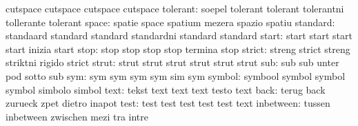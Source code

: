                            cutspace                  cutspace
                           cutspace                  cutspace %
                 tolerant: soepel                    tolerant
                           tolerant                  tolerantni
                           tollerante                tolerant
                    space: spatie                    space
                           spatium                   mezera
                           spazio                    spatiu %
                 standard: standaard                 standard
                           standard                  standardni
                           standard                  standard
                    start: start                     start
                           start                     start
                           inizia                    start
                     stop: stop                      stop
                           stop                      stop
                           termina                   stop
                   strict: streng                    strict
                           streng                    striktni
                           rigido                    strict
                    strut: strut                     strut
                           strut                     strut
                           strut                     strut
                      sub: sub                       sub
                           unter                     pod
                           sotto                     sub
                      sym: sym                       sym
                           sym                       sym
                           sim                       sym
                   symbol: symbool                   symbol
                           symbol                    symbol
                           simbolo                   simbol
                     text: tekst                     text
                           text                      text
                           testo                     text
                     back: terug                     back
                           zurueck                   zpet
                           dietro                    inapot
                     test: test                      test
                           test                      test
                           test                      text
                inbetween: tussen                    inbetween
                           zwischen                  mezi
                           tra                       intre
